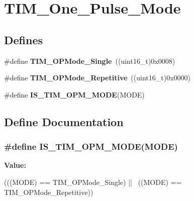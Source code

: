 \hypertarget{group__TIM__One__Pulse__Mode}{
\section{TIM\_\-One\_\-Pulse\_\-Mode}
\label{group__TIM__One__Pulse__Mode}
}
\subsection*{Defines}
\begin{DoxyCompactItemize}
\item 
\hypertarget{group__TIM__One__Pulse__Mode_ga99d934fdbc54ea4ee2cf5c86860f9227}{
\#define {\bfseries TIM\_\-OPMode\_\-Single}~((uint16\_\-t)0x0008)}
\label{group__TIM__One__Pulse__Mode_ga99d934fdbc54ea4ee2cf5c86860f9227}

\item 
\hypertarget{group__TIM__One__Pulse__Mode_gad921d739c86bf48dca12442a81ad68ad}{
\#define {\bfseries TIM\_\-OPMode\_\-Repetitive}~((uint16\_\-t)0x0000)}
\label{group__TIM__One__Pulse__Mode_gad921d739c86bf48dca12442a81ad68ad}

\item 
\#define {\bfseries IS\_\-TIM\_\-OPM\_\-MODE}(MODE)
\end{DoxyCompactItemize}


\subsection{Define Documentation}
\hypertarget{group__TIM__One__Pulse__Mode_ga3f4a4305b4feacb4322eb4a358e54637}{
\subsubsection[{IS\_\-TIM\_\-OPM\_\-MODE}]{\setlength{\rightskip}{0pt plus 5cm}\#define IS\_\-TIM\_\-OPM\_\-MODE(MODE)}}
\label{group__TIM__One__Pulse__Mode_ga3f4a4305b4feacb4322eb4a358e54637}
{\bfseries Value:}
\begin{DoxyCode}
(((MODE) == TIM_OPMode_Single) || \
                               ((MODE) == TIM_OPMode_Repetitive))
\end{DoxyCode}
